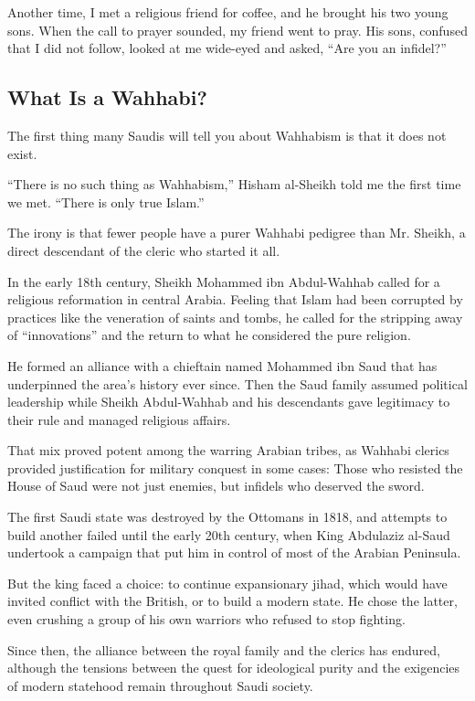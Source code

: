 Another time, I met a religious friend for coffee, and he brought his
two young sons. When the call to prayer sounded, my friend went to pray.
His sons, confused that I did not follow, looked at me wide-eyed and
asked, ``Are you an infidel?''

\hypertarget{what-is-a-wahhabi}{%
\subsection{What Is a Wahhabi?}\label{what-is-a-wahhabi}}

The first thing many Saudis will tell you about Wahhabism is that it
does not exist.

``There is no such thing as Wahhabism,'' Hisham al-Sheikh told me the
first time we met. ``There is only true Islam.''

The irony is that fewer people have a purer Wahhabi pedigree than Mr.
Sheikh, a direct descendant of the cleric who started it all.

In the early 18th century, Sheikh Mohammed ibn Abdul-Wahhab called for a
religious reformation in central Arabia. Feeling that Islam had been
corrupted by practices like the veneration of saints and tombs, he
called for the stripping away of ``innovations'' and the return to what
he considered the pure religion.

He formed an alliance with a chieftain named Mohammed ibn Saud that has
underpinned the area's history ever since. Then the Saud family assumed
political leadership while Sheikh Abdul-Wahhab and his descendants gave
legitimacy to their rule and managed religious affairs.

That mix proved potent among the warring Arabian tribes, as Wahhabi
clerics provided justification for military conquest in some cases:
Those who resisted the House of Saud were not just enemies, but infidels
who deserved the sword.

The first Saudi state was destroyed by the Ottomans in 1818, and
attempts to build another failed until the early 20th century, when King
Abdulaziz al-Saud undertook a campaign that put him in control of most
of the Arabian Peninsula.

But the king faced a choice: to continue expansionary jihad, which would
have invited conflict with the British, or to build a modern state. He
chose the latter, even crushing a group of his own warriors who refused
to stop fighting.

Since then, the alliance between the royal family and the clerics has
endured, although the tensions between the quest for ideological purity
and the exigencies of modern statehood remain throughout Saudi society.

